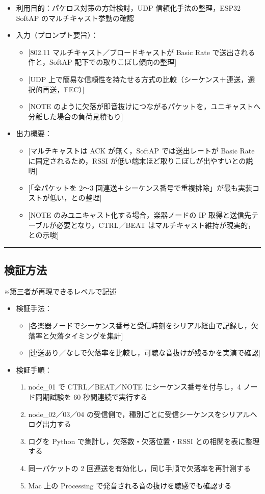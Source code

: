 \documentclass[uplatex,dvipdfmx,a4paper,11pt]{jsarticle}
\newcommand{\sectionrule}{\par\medskip\noindent\rule{\linewidth}{0.6pt}\par\medskip}
\begin{document}
\begin{itemize}
  \item 利用目的：パケロス対策の方針検討，UDP 信頼化手法の整理，ESP32 SoftAP のマルチキャスト挙動の確認
  \item 入力（プロンプト要旨）：
    \begin{itemize}
      \item {}[802.11 マルチキャスト／ブロードキャストが Basic Rate で送出される件と，SoftAP 配下での取りこぼし傾向の整理]
      \item {}[UDP 上で簡易な信頼性を持たせる方式の比較（シーケンス＋連送，選択的再送，FEC）]
      \item {}[NOTE のように欠落が即音抜けにつながるパケットを，ユニキャストへ分離した場合の負荷見積もり]
    \end{itemize}
  \item 出力概要：
    \begin{itemize}
      \item {}[マルチキャストは ACK が無く，SoftAP では送出レートが Basic Rate に固定されるため，RSSI が低い端末ほど取りこぼしが出やすいとの説明]
      \item {}[「全パケットを 2〜3 回連送＋シーケンス番号で重複排除」が最も実装コストが低い，との整理]
      \item {}[NOTE のみユニキャスト化する場合，楽器ノードの IP 取得と送信先テーブルが必要となり，CTRL／BEAT はマルチキャスト維持が現実的，との示唆]
    \end{itemize}
\end{itemize}

\sectionrule

\subsection{検証方法}

※第三者が再現できるレベルで記述

\begin{itemize}
  \item 検証手法：
    \begin{itemize}
      \item {}[各楽器ノードでシーケンス番号と受信時刻をシリアル経由で記録し，欠落率と欠落タイミングを集計]
      \item {}[連送あり／なしで欠落率を比較し，可聴な音抜けが残るかを実演で確認]
    \end{itemize}
  \item 検証手順：
    \begin{enumerate}
      \item node\_01 で CTRL／BEAT／NOTE にシーケンス番号を付与し，4 ノード同期試験を 60 秒間連続で実行する
      \item node\_02／03／04 の受信側で，種別ごとに受信シーケンスをシリアルへログ出力する
      \item ログを Python で集計し，欠落数・欠落位置・RSSI との相関を表に整理する
      \item 同一パケットの 2 回連送を有効化し，同じ手順で欠落率を再計測する
      \item Mac 上の Processing で発音される音の抜けを聴感でも確認する
    \end{enumerate}
\end{itemize}
\end{document}
